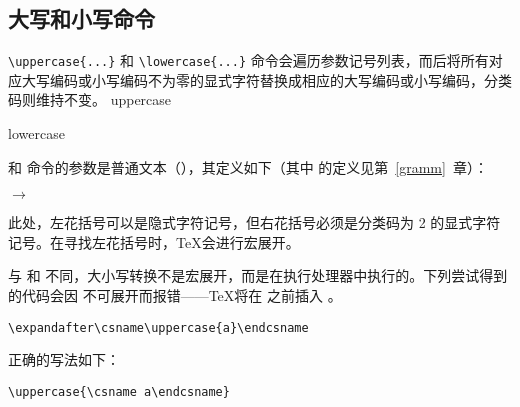 \documentclass{book}
\begin{document}
\subsection{大写和小写命令}
\label{upcase}

\verb-\uppercase{...}- 和 \verb-\lowercase{...}- 命令会遍历参数记号列表，而后将所有对应大写编码或小写编码不为零的显式字符替换成相应的大写编码或小写编码，分类码则维持不变。
\cstoidx uppercase\par\cstoidx lowercase\par

 和  命令的参数是普通文本（），其定义如下（其中  的定义见第~\ref{gramm}~章）：
\begin{Disp}
 $\longrightarrow$ \lb{}
\end{Disp}
此处，左花括号可以是隐式字符记号，但右花括号必须是分类码为 2 的显式字符记号。在寻找左花括号时，\TeX 会进行宏展开。

与  和  不同，大小写转换不是宏展开，而是在执行处理器中执行的。下列尝试得到  的代码会因  不可展开而报错——\TeX 将在  之前插入 。
\begin{verbatim}
\expandafter\csname\uppercase{a}\endcsname
\end{verbatim}
正确的写法如下：
\begin{verbatim}
\uppercase{\csname a\endcsname}
\end{verbatim}
\end{document}
